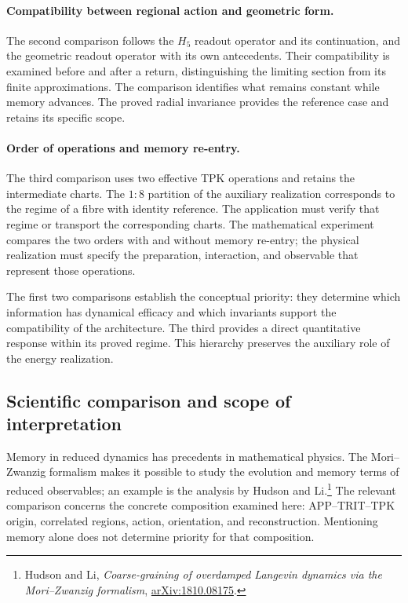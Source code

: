 \paragraph{Compatibility between regional action and geometric form.}
The second comparison follows the $H_5$ readout operator and its continuation, and
the geometric readout operator with its own antecedents. Their compatibility
is examined before and after a return, distinguishing the limiting
section from its finite approximations. The comparison identifies what
remains constant while memory advances. The proved radial invariance
provides the reference case and retains its specific
scope.

\paragraph{Order of operations and memory re-entry.}
The third comparison uses two effective TPK operations and
retains the intermediate charts. The $1:8$ partition of the auxiliary
realization corresponds to the regime of a fibre with identity reference.
The application must verify that regime or transport the corresponding
charts. The mathematical experiment compares the two orders
with and without memory re-entry; the physical realization must specify
the preparation, interaction, and observable that represent those
operations.

The first two comparisons establish the conceptual priority: they determine
which information has dynamical efficacy and which invariants support
the compatibility of the architecture. The third provides a
direct quantitative response within its proved regime.
This hierarchy preserves the auxiliary role of the energy realization.

\subsection{Scientific comparison and scope of interpretation}
\label{md:lectin:comparacion}

Memory in reduced dynamics has precedents in mathematical
physics. The Mori--Zwanzig formalism makes it possible to study the
evolution and memory terms of reduced observables; an
example is the analysis by Hudson and Li.\footnote{Hudson and Li,
\emph{Coarse-graining of overdamped Langevin dynamics via the
Mori--Zwanzig formalism},
\href{https://arxiv.org/abs/1810.08175}{arXiv:1810.08175}.}
The relevant comparison concerns the concrete composition examined
here: APP--TRIT--TPK origin, correlated regions, action,
orientation, and reconstruction. Mentioning memory alone does not
determine priority for that composition.

